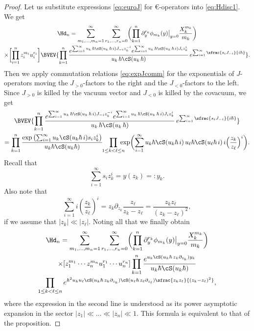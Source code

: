 \begin{proof}
Let us substitute expressions \eqref{eq:euroJ} for $\euro$-operators into \eqref{eq:Hdisc1}. We get
\begin{multline*}
\Hd_n=\sum_{m_1,\dots,m_n=1}^\infty
\sum_{r_1,\dots,r_n=0}^\infty
\biggl(\prod_{k=1}^n\partial_y^{r_k}\phi_{m_k}(y)\big|_{y=0}\frac{X_k^{m_k}}{m_k}\biggr)
\\
\times\biggl[\prod_{i=1}^n z_i^{m_i}u_i^{r_i}\biggr]
\BVEV{\prod_{k=1}^n\dfrac{
e^{\sum_{i=1}^\infty u_k\,\hbar\cS(u_k\,\hbar\,i) J_{-i}z_k^{-i}}
e^{\sum_{i=1}^\infty u_k\,\hbar \cS(u_k\,\hbar\,i) J_{i}z_k^{i}}}
{u_k\,\hbar\cS(u_k\,\hbar)}\,
e^{\sum_{i=1}^\infty \sfrac{s_i J_{-i}}{i\hbar} }
}.
\end{multline*}
Then we apply commutation relations \eqref{eq:expJcomm} for the exponentials of $J$-operators moving the $J_{>0}$-factors to the right and the $J_{<0}$-factors to the left. Since $J_{>0}$ is killed by the vacuum vector and $J_{<0}$ is killed by the covacuum, we get
\begin{multline*}
\BVEV{\prod_{k=1}^n\dfrac{
e^{\sum_{i=1}^\infty u_k\,\hbar\cS(u_k\,\hbar\,i) J_{-i}z_k^{-i}}
e^{\sum_{i=1}^\infty u_k\,\hbar \cS(u_k\,\hbar\,i) J_{i}z_k^{i}}}
{u_k\,\hbar\cS(u_k\,\hbar)}\,
e^{\sum_{i=1}^\infty \sfrac{s_i J_{-i}}{i\hbar} }}
\\
= \prod_{k=1}^n \dfrac{\exp\left(\sum_{i=1}^\infty u_k\cS(u_k\hbar\,i)s_iz_k^i \right)}
{u_k\hbar\cS(u_k\hbar)}\hspace*{-1mm}
\prod_{1\le k<\ell\le n}\hspace*{-3mm}
\exp\biggl(\sum_{i=1}^\infty u_k\hbar\cS(u_k\hbar\,i)\,u_\ell\hbar\cS(u_\ell\hbar\,i)
\,i\Bigl(\dfrac{z_k}{z_\ell}\Bigr)^i \biggr).
\end{multline*}
Recall that
\[
\sum_{i=1}^\infty s_i z_k^i=y(z_k)=:y_k.
\]
Also note that
\[
\label{eq:bergexp}
\sum_{i=1}^\infty i\left(\dfrac{z_k}{z_\ell}\right)^i
=z_k\partial_{z_k}\frac{z_\ell}{z_k-z_\ell}=\frac{z_kz_\ell}{(z_k-z_\ell)^2},
\]
if we assume that $|z_k| \ll |z_\ell|$. Noting all that we finally obtain
\begin{multline*}
\Hd_n=\sum_{m_1,\dots,m_n=1}^\infty
\sum_{r_1,\dots,r_n=0}^\infty
\biggl(\prod_{k=1}^n\partial_y^{r_k}\phi_{m_k}(y)\big|_{y=0}\frac{X_k^{m_k}}{m_k}\biggr)\\
\times[z_1^{m_1}\cdots z_n^{m_n}u_1^{r_1}\cdots u_n^{r_n}]
\prod_{k=1}^n \frac{e^{ u_k\cS(u_k\hbar\,z_k\partial_{z_k})y_k }}
{u_k\hbar\cS(u_k\hbar)}\\
\prod_{1\le k<\ell\le n}
e^{\hbar^2u_ku_\ell\cS(u_k\hbar\,z_k\partial_{z_k})\cS(u_\ell\hbar\,z_\ell\partial_{z_\ell})
\sfrac{z_k z_\ell}{(z_k-z_\ell)^2}},
\end{multline*}
where the expression in the second line is understood as its power asymptotic expansion in the sector $|z_1|\ll\dots\ll|z_n|\ll1$. This formula is equivalent to that of the proposition.
\end{proof}

